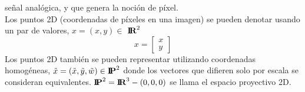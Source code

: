 señal analógica, y que genera la noción de píxel.\\
Los puntos 2D (coordenadas de píxeles en una imagen) se pueden denotar usando un par de valores, $x = (x,y) \in$ ${\textbf{I\!R}^2}$\cite{Book:Richard2011}
\begin{equation}
	x = \left[
		\begin{array}{c}
			x \\
			y
		\end{array}
		\right]
\end{equation}
Los puntos 2D también se pueden representar utilizando coordenadas homogéneas, $\tilde{x} = (\tilde{x},\tilde{y}, \tilde{w}) \in {\textbf{I\!P}^2}$
donde los vectores que difieren solo por escala se consideran equivalentes. ${\textbf{I\!P}^2} = {\textbf{I\!R}^3} -  (0,0,0) $ se llama el espacio proyectivo 2D.



